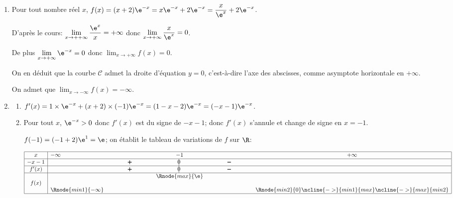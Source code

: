 \medskip

\begin{enumerate}
\item Pour tout nombre réel $x$, $f(x) = (x + 2)\e^{-x}=x\e^{-x}+2\e^{-x}
= \dfrac{x}{\e^{x}}+ 2\e^{-x}$.



D'après le cours: $\displaystyle\lim_{x \to ++ \infty} \dfrac{\e^{x}}{x}= +\infty$ donc  $\displaystyle\lim_{x \to + \infty} \dfrac{x}{\e^{x}}= 0$.

De plus $\displaystyle\lim_{x \to + \infty} \e^{-x}= 0$ donc $\displaystyle\lim_{x \to + \infty} f(x) = 0$.



On en déduit que la courbe $\mathcal{C}$ admet la droite d'équation $y=0$, c'est-à-dire l'axe des abscisses, comme asymptote horizontale en $+\infty$.

On admet que $\displaystyle\lim_{x \to - \infty} f(x) = - \infty$.
\item 
	\begin{enumerate}
		\item
$f'(x)=1\times \e^{-x} + (x+2)\times (-1)\e^{-x} = (1-x-2) \e^{-x}=(-x-1)\e^{-x}$. 		
		
		\item
Pour tout $x$, $\e^{-x}>0$ donc $f'(x)$ est du signe de $-x-1$; donc $f'(x)$ s'annule et change de signe en $x=-1$.

$f(-1) = (-1+2)\e^{1}=\e$; on établit le tableau de variations de $f$ sur $\R$:

\begin{center}
{\renewcommand{\arraystretch}{1.5}
\def\esp{\hspace*{2.5cm}}
\def\hauteur{0pt}
$\begin{array}{|c|l*4{c}|}
\hline
x & -\infty  & \esp & -1 & \esp & +\infty \\ 
\hline
-x-1 &    &   \pmb{+} & \vline\hspace{-2.7pt}0 & \pmb{-} & \\ 
\hline
f'(x) &    &   \pmb{+} & \vline\hspace{-2.7pt}0 & \pmb{-} & \\ 
\hline
 &  &  &   \Rnode{max}{\e}  &  &  \rule{0pt}{\hauteur} \\  
f(x) &   &     &  &  &  \rule{0pt}{\hauteur} \\ 
 &  \Rnode{min1}{-\infty} &   &  &  &   \Rnode{min2}{0} \rule{0pt}{\hauteur}    
 \ncline{->}{min1}{max} 
 \ncline{->}{max}{min2} 
 \\ 
\hline
\end{array} $
}
\end{center}	
	

\end{enumerate}
\end{enumerate}
